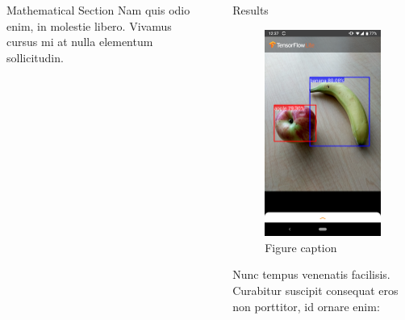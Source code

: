 \documentclass[final]{beamer}
\newlength{\sepwid}
\newlength{\onecolwid}
\begin{document}
\begin{frame}[t]
\begin{columns}[t]
\begin{column}{\onecolwid}
\begin{block}{Mathematical Section}
Nam quis odio enim, in molestie libero. Vivamus cursus mi at nulla elementum sollicitudin.

\end{block}


\end{column} %

\begin{column}{\sepwid}
\end{column} %

\begin{column}{\onecolwid} %

%
\begin{block}{Results}

\begin{figure}
\includegraphics[width=0.6\linewidth]{android_apple_banana.png}
\caption{Figure caption}
\end{figure}

Nunc tempus venenatis facilisis. Curabitur suscipit consequat eros non porttitor, id ornare enim:


\end{block}
\end{column}
\end{columns}
\end{frame}
\end{document}
